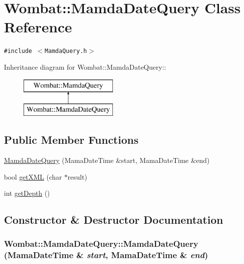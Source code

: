 \hypertarget{classWombat_1_1MamdaDateQuery}{
\section{Wombat::Mamda\-Date\-Query Class Reference}
\label{classWombat_1_1MamdaDateQuery}
}
{\tt \#include $<$Mamda\-Query.h$>$}

Inheritance diagram for Wombat::Mamda\-Date\-Query::\begin{figure}[H]
\begin{center}
\leavevmode
\includegraphics[height=2cm]{classWombat_1_1MamdaDateQuery}
\end{center}
\end{figure}
\subsection*{Public Member Functions}
\begin{CompactItemize}
\item 
\hyperlink{classWombat_1_1MamdaDateQuery_f83feaa0c1bb10b68ad8419b6f0847eb}{Mamda\-Date\-Query} (Mama\-Date\-Time \&start, Mama\-Date\-Time \&end)
\item 
bool \hyperlink{classWombat_1_1MamdaDateQuery_8e0c342e335888cd44216830ad40a195}{get\-XML} (char $\ast$result)
\item 
int \hyperlink{classWombat_1_1MamdaDateQuery_85e1e17ac7698588ed036ff47aa51327}{get\-Depth} ()
\end{CompactItemize}


\subsection{Constructor \& Destructor Documentation}
\hypertarget{classWombat_1_1MamdaDateQuery_f83feaa0c1bb10b68ad8419b6f0847eb}{
\subsubsection[MamdaDateQuery]{\setlength{\rightskip}{0pt plus 5cm}Wombat::Mamda\-Date\-Query::Mamda\-Date\-Query (Mama\-Date\-Time \& {\em start}, Mama\-Date\-Time \& {\em end})}}
\label{classWombat_1_1MamdaDateQuery_f83feaa0c1bb10b68ad8419b6f0847eb}





